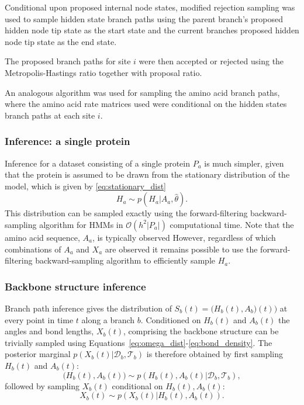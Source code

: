 \documentclass[nogrid]{MBE}%
\begin{document}
Conditional upon proposed internal node states, modified rejection sampling was used to sample hidden state branch paths using the parent branch's proposed hidden node tip state as the start state and the current branches proposed hidden node tip state as the end state.

The proposed branch paths for site $i$ were then accepted or rejected using the Metropolis-Hastings ratio together with proposal ratio.

An analogous algorithm was used for sampling the amino acid branch paths, where the amino acid rate matrices used were conditional on the hidden states branch paths at each site $i$.

\subsubsection{Inference: a single protein}
Inference for a dataset consisting of a single protein $P_{a}$ is much simpler, given that the protein is assumed to be drawn from the stationary distribution of the model, which is given by \eqref{eq:stationary_dist}
\begin{equation}
H_{a} \sim p(H_{a}|A_{a},\hat{\theta}).
\end{equation}
This distribution can be sampled exactly using the forward-filtering backward-sampling algorithm for HMMs \citep{fruhwirth1994data} in $\mathcal{O}(h^{2}|P_{a}|)$ computational time. Note that the amino acid sequence, $A_{a}$, is typically observed However, regardless of which combinations of $A_{a}$ and $X_{a}$ are observed it remains possible to use the forward-filtering backward-sampling algorithm to efficiently sample $H_{a}$.

\subsubsection{Backbone structure inference}
Branch path inference gives the distribution of $S_{b}(t)=\big(H_{b}(t),A_{b}\big)(t))$ at every point in time $t$ along a branch $b$. Conditioned on $H_{b}(t)$ and $A_{b}(t)$ the angles and bond lengths, $X_{b}(t)$, comprising the backbone structure can be trivially sampled using Equations~\ref{eq:omega_dist}-\ref{eq:bond_density}. The posterior marginal $p(X_{b}(t)|\mathcal{D}_{b},\mathcal{T}_{b})$ is therefore obtained by first sampling $H_{b}(t)$ and $A_{b}(t)$:
\begin{equation}
\big(H_{b}(t),A_{b}(t)\big) \sim p(H_{b}(t),A_{b}(t)|\mathcal{D}_{b},\mathcal{T}_{b}),
\end{equation}
followed by sampling $X_{b}(t)$ conditional on $H_{b}(t),A_{b}(t)$:
\begin{equation}
X_{b}(t) \sim p(X_{b}(t)|H_{b}(t),A_{b}(t)).
\end{equation}
\end{document}
